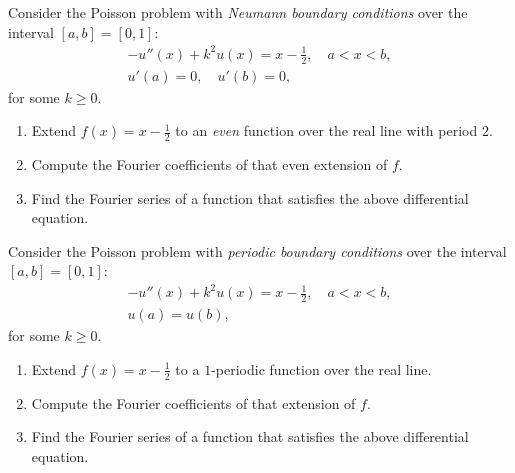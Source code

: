 \documentclass[11pt]{article}
\begin{document}
\begin{exercise}
    Consider the Poisson problem with \textit{Neumann boundary conditions} over the interval $[a,b] = [0,1]$: 
    \begin{gather*}
        - u''(x) + k^2 u(x) = x - \frac 1 2, \quad a < x < b,
        \\
        u'(a) = 0, \quad u'(b) = 0,
    \end{gather*}
    for some $k \geq 0$.
    \begin{enumerate}[label=(\alph*)]
        \item
        Extend $f(x) = x - \frac 1 2$ to an \textit{even} function over the real line with period $2$.
        \item 
        Compute the Fourier coefficients of that even extension of $f$.
        \item 
        Find the Fourier series of a function that satisfies the above differential equation.
    \end{enumerate}
\end{exercise}
\begin{solution}     
\end{solution}

\begin{exercise}
    Consider the Poisson problem with \textit{periodic boundary conditions} over the interval $[a,b] = [0,1]$: 
    \begin{gather*}
        - u''(x) + k^2 u(x) = x - \frac 1 2, \quad a < x < b,
        \\
        u(a) = u(b),
    \end{gather*}
    for some $k \geq 0$.
    \begin{enumerate}[label=(\alph*)]
        \item
        Extend $f(x) = x - \frac 1 2$ to a $1$-periodic function over the real line.
        \item 
        Compute the Fourier coefficients of that extension of $f$.
        \item 
        Find the Fourier series of a function that satisfies the above differential equation.
    \end{enumerate}
\end{exercise}
\begin{solution}     
\end{solution}



% 
\end{document}
